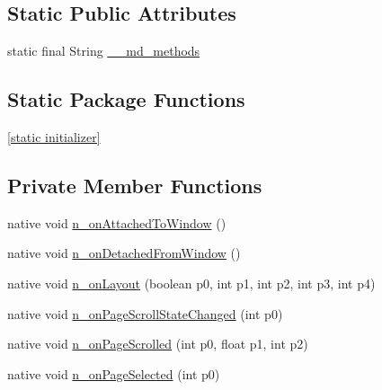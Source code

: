 \subsection*{Static Public Attributes}
\begin{CompactItemize}
\item 
static final String \hyperlink{classmd5270abb39e60627f0f200893b490a1ade_1_1_carousel_page_renderer_30dd5844560aeae1db3e3ff655ce8f76}{\_\-\_\-md\_\-methods}
\end{CompactItemize}
\subsection*{Static Package Functions}
\begin{CompactItemize}
\item 
\hyperlink{classmd5270abb39e60627f0f200893b490a1ade_1_1_carousel_page_renderer_0d33189bd19fbe8b468568faf789f877}{\mbox{[}static initializer\mbox{]}}
\end{CompactItemize}
\subsection*{Private Member Functions}
\begin{CompactItemize}
\item 
native void \hyperlink{classmd5270abb39e60627f0f200893b490a1ade_1_1_carousel_page_renderer_3f13b7b13f3447c1c7192520900c5777}{n\_\-onAttachedToWindow} ()
\item 
native void \hyperlink{classmd5270abb39e60627f0f200893b490a1ade_1_1_carousel_page_renderer_8d62856586e2da23d0d3f8f26d5bd4ba}{n\_\-onDetachedFromWindow} ()
\item 
native void \hyperlink{classmd5270abb39e60627f0f200893b490a1ade_1_1_carousel_page_renderer_20a089cd60211dba7bd4767bee115a9e}{n\_\-onLayout} (boolean p0, int p1, int p2, int p3, int p4)
\item 
native void \hyperlink{classmd5270abb39e60627f0f200893b490a1ade_1_1_carousel_page_renderer_41963e1af7e5310a4730f4c2485aec69}{n\_\-onPageScrollStateChanged} (int p0)
\item 
native void \hyperlink{classmd5270abb39e60627f0f200893b490a1ade_1_1_carousel_page_renderer_54806a422e44f11b84b52905c7f88314}{n\_\-onPageScrolled} (int p0, float p1, int p2)
\item 
native void \hyperlink{classmd5270abb39e60627f0f200893b490a1ade_1_1_carousel_page_renderer_b84a3441e29c02bf48219aeaeb010773}{n\_\-onPageSelected} (int p0)
\end{CompactItemize}
